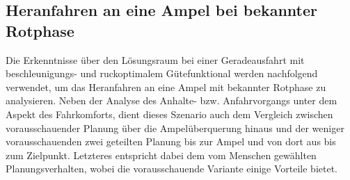 
\subsection{Heranfahren an eine Ampel bei bekannter Rotphase}\label{subsec:Ampelszenario}
Die Erkenntnisse über den Lösungsraum bei einer Geradeausfahrt mit beschleunigungs- und ruckoptimalem Gütefunktional werden nachfolgend verwendet, um das Heranfahren an eine Ampel mit bekannter Rotphase zu analysieren. Neben der Analyse des Anhalte- bzw. Anfahrvorgangs unter dem Aspekt des Fahrkomforts, dient dieses Szenario auch dem Vergleich zwischen vorausschauender Planung über die Ampelüberquerung hinaus und der weniger vorausschauenden zwei geteilten Planung bis zur Ampel und von dort aus bis zum Zielpunkt. Letzteres entspricht dabei dem vom Menschen gewählten Planungsverhalten, wobei die vorausschauende Variante einige Vorteile bietet. 

